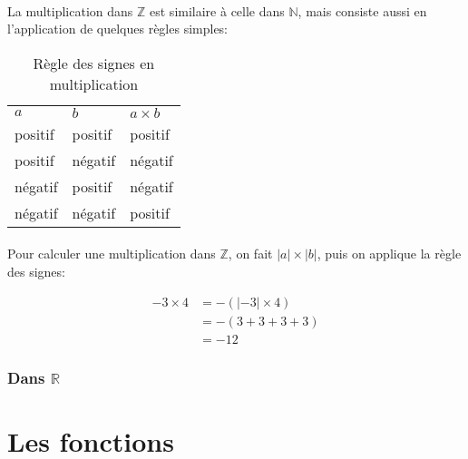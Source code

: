 \documentclass[a4paper]{book}
\begin{document}
    \paragraph{}
    La multiplication dans $\mathds{Z}$ est similaire à celle dans $\mathds{N}$, mais consiste aussi en l'application de quelques règles simples:
    
    \begin{table}[h]
        \centering
        \begin{tabular}{ll|l}
            $a$ & $b$ & $a \times b$  \\
            positif & positif & positif \\
            positif & négatif & négatif \\
            négatif & positif & négatif \\
            négatif & négatif & positif
        \end{tabular}
        \caption{Règle des signes en multiplication}
        \label{tab:regles_signes_multiplication}
    \end{table}
    
    \paragraph{}
    Pour calculer une multiplication dans $\mathds{Z}$, on fait $|a| \times |b|$, puis on applique la règle des signes:
    
    \begin{equation*}
        \begin{split}
            -3 \times 4 &= -(|-3| \times 4) \\
                        &= -(3 + 3 + 3 + 3) \\
                        &= -12
        \end{split}
    \end{equation*}
    
    \subsubsection{Dans $\mathds{R}$}
    \paragraph{}
    
    
    
    \section{Les fonctions}
\end{document}
